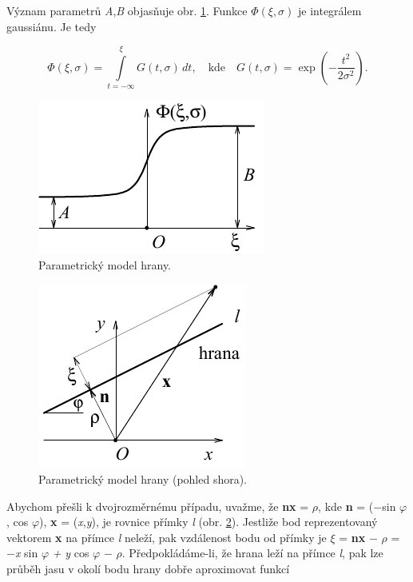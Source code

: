 Význam parametrů \textit{A},\textit{B} objasňuje obr. \ref{img:8_11}. Funkce $\Phi(\xi, \sigma)$ je integrálem gaussiánu. Je tedy

\begin{equation} \label{eq:8_23}
    \Phi(\xi, \sigma) = \int\limits_{t=-\infty}^{\xi} G(t, \sigma)\,dt, \quad \mathrm{kde} \quad G(t, \sigma) = \exp \left( - \frac{t^2}{2\sigma^2} \right).
\end{equation}

\begin{figure}[th]
    \begin{center}
        \includegraphics[scale=0.9]{08_segmentace/images/img_8_11.pdf}
    \end{center}
    \caption{Parametrický model hrany.}
    \label{img:8_11}
\end{figure}

\begin{figure}[th]
    \begin{center}
        \includegraphics[scale=0.9]{08_segmentace/images/img_8_12.pdf}
    \end{center}
    \caption{Parametrický model hrany (pohled shora).}
    \label{img:8_12}
\end{figure}

Abychom přešli k dvojrozměrnému případu, uvažme, že \textbf{nx} = $\rho$, kde \textbf{n} = ($-$sin $\varphi$, cos $\varphi$), \textbf{x }= (\textit{x},\textit{y}), je rovnice přímky \textit{l} (obr. \ref{img:8_12}). Jestliže bod reprezentovaný vektorem \textbf{x} na přímce \textit{l} neleží, pak vzdálenost bodu od přímky je $\xi$ = \textbf{nx} $-$ $\rho$ = $-$\textit{x} sin $\varphi$ \textit{+} \textit{y} cos $\varphi$ $-$ $\rho$. Předpokládáme-li, že hrana leží na přímce \textit{l}, pak lze průběh jasu v okolí bodu hrany dobře aproximovat funkcí

